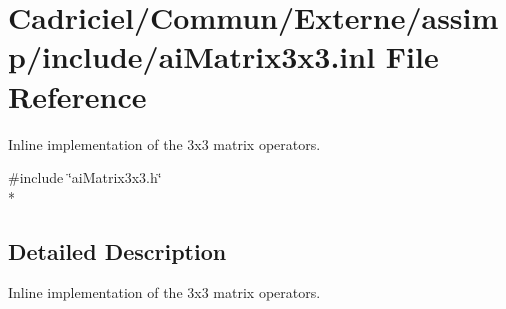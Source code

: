 \hypertarget{ai_matrix3x3_8inl}{\section{Cadriciel/\-Commun/\-Externe/assimp/include/ai\-Matrix3x3.inl File Reference}
\label{ai_matrix3x3_8inl}
}


Inline implementation of the 3x3 matrix operators.  


{\ttfamily \#include \char`\"{}ai\-Matrix3x3.\-h\char`\"{}}\\*


\subsection{Detailed Description}
Inline implementation of the 3x3 matrix operators. 